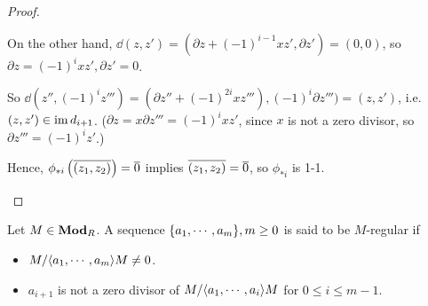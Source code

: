 \begin{prop}
\begin{proof}
\begin{itemize}
        On the other hand, $\dd(z, z') = (\partial z + (-1)^{i-1} xz', \partial z') = (0, 0)$, so
        $\partial z = (-1)^i xz', \partial z' = 0$.

        So $\dd(z'', (-1)^i z''') = (\partial z'' + (-1)^{2i} x z'''), (-1)^i \partial z''')
        = (z, z')$, i.e. $(z, z') \in \operatorname{im} d_{i+1}$. 
        ($\partial z = x \partial z''' = (-1)^i xz'$, since $x$ is not a zero divisor, 
        so $\partial z''' = (-1)^i z'$.)

        Hence, $\phi_{*i}\left(\overline{(z_1, z_2)}\right) = \overline{0}$ implies 
        $\overline{(z_1, z_2)} = \overline{0}$, so $\phi_{*i}$ is 1-1.
    \end{itemize}
  \end{proof}
\end{prop}

\begin{definition}
  Let $M \in \mathbf{Mod}_R$. A sequence $\lbrace a_1, \cdots, a_m\rbrace, m \ge 0$ is said to be
  $M$-regular if
  \begin{itemize}
    \item $M/\langle a_1, \cdots, a_m\rangle M \neq 0$.
    \item $a_{i+1}$ is not a zero divisor of $M/\langle a_1, \cdots, a_i\rangle M$ for 
      $0 \le i \le m-1$.
  \end{itemize}
\end{definition}

